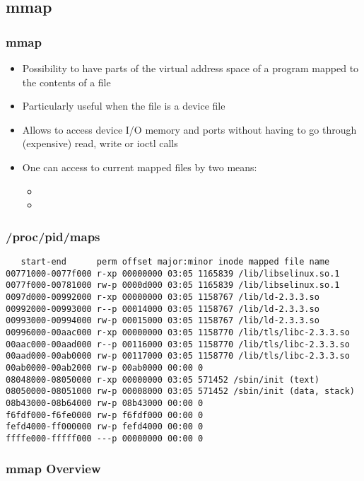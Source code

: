 \subsection{mmap}

\begin{frame}
  \frametitle{mmap}
  \begin{itemize}
  \item Possibility to have parts of the virtual address space of a
    program mapped to the contents of a file
  \item Particularly useful when the file is a device file
  \item Allows to access device I/O memory and ports without having to
    go through (expensive) read, write or ioctl calls
  \item One can access to current mapped files by two means:
    \begin{itemize}
    \item {}
    \item {}
    \end{itemize}
  \end{itemize}
\end{frame}

\begin{frame}[fragile]
  \frametitle{/proc/pid/maps}
{\footnotesize
\begin{verbatim}
   start-end      perm offset major:minor inode mapped file name
00771000-0077f000 r-xp 00000000 03:05 1165839 /lib/libselinux.so.1
0077f000-00781000 rw-p 0000d000 03:05 1165839 /lib/libselinux.so.1
0097d000-00992000 r-xp 00000000 03:05 1158767 /lib/ld-2.3.3.so
00992000-00993000 r--p 00014000 03:05 1158767 /lib/ld-2.3.3.so
00993000-00994000 rw-p 00015000 03:05 1158767 /lib/ld-2.3.3.so
00996000-00aac000 r-xp 00000000 03:05 1158770 /lib/tls/libc-2.3.3.so
00aac000-00aad000 r--p 00116000 03:05 1158770 /lib/tls/libc-2.3.3.so
00aad000-00ab0000 rw-p 00117000 03:05 1158770 /lib/tls/libc-2.3.3.so
00ab0000-00ab2000 rw-p 00ab0000 00:00 0
08048000-08050000 r-xp 00000000 03:05 571452 /sbin/init (text)
08050000-08051000 rw-p 00008000 03:05 571452 /sbin/init (data, stack)
08b43000-08b64000 rw-p 08b43000 00:00 0
f6fdf000-f6fe0000 rw-p f6fdf000 00:00 0
fefd4000-ff000000 rw-p fefd4000 00:00 0
ffffe000-fffff000 ---p 00000000 00:00 0
\end{verbatim}
}
\end{frame}

\begin{frame}
  \frametitle{mmap Overview}
  \begin{center}
  \end{center}
\end{frame}

